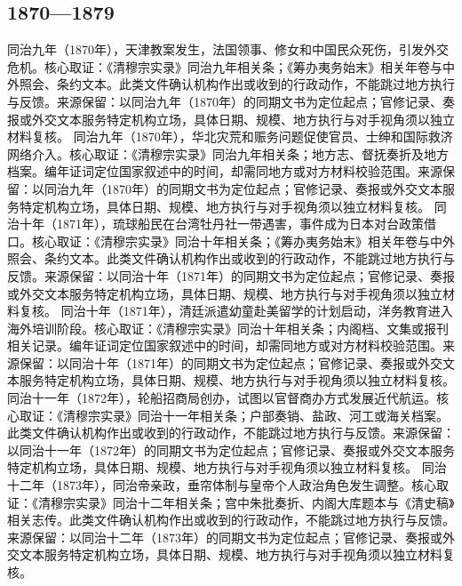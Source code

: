 \subsection{1870—1879}
同治九年（1870年），天津教案发生，法国领事、修女和中国民众死伤，引发外交危机。核心取证：《清穆宗实录》同治九年相关条；《筹办夷务始末》相关年卷与中外照会、条约文本。此类文件确认机构作出或收到的行政动作，不能跳过地方执行与反馈。来源保留：以同治九年（1870年）的同期文书为定位起点；官修记录、奏报或外交文本服务特定机构立场，具体日期、规模、地方执行与对手视角须以独立材料复核。
同治九年（1870年），华北灾荒和赈务问题促使官员、士绅和国际救济网络介入。核心取证：《清穆宗实录》同治九年相关条；地方志、督抚奏折及地方档案。编年证词定位国家叙述中的时间，却需同地方或对方材料校验范围。来源保留：以同治九年（1870年）的同期文书为定位起点；官修记录、奏报或外交文本服务特定机构立场，具体日期、规模、地方执行与对手视角须以独立材料复核。
同治十年（1871年），琉球船民在台湾牡丹社一带遇害，事件成为日本对台政策借口。核心取证：《清穆宗实录》同治十年相关条；《筹办夷务始末》相关年卷与中外照会、条约文本。此类文件确认机构作出或收到的行政动作，不能跳过地方执行与反馈。来源保留：以同治十年（1871年）的同期文书为定位起点；官修记录、奏报或外交文本服务特定机构立场，具体日期、规模、地方执行与对手视角须以独立材料复核。
同治十年（1871年），清廷派遣幼童赴美留学的计划启动，洋务教育进入海外培训阶段。核心取证：《清穆宗实录》同治十年相关条；内阁档、文集或报刊相关记录。编年证词定位国家叙述中的时间，却需同地方或对方材料校验范围。来源保留：以同治十年（1871年）的同期文书为定位起点；官修记录、奏报或外交文本服务特定机构立场，具体日期、规模、地方执行与对手视角须以独立材料复核。
同治十一年（1872年），轮船招商局创办，试图以官督商办方式发展近代航运。核心取证：《清穆宗实录》同治十一年相关条；户部奏销、盐政、河工或海关档案。此类文件确认机构作出或收到的行政动作，不能跳过地方执行与反馈。来源保留：以同治十一年（1872年）的同期文书为定位起点；官修记录、奏报或外交文本服务特定机构立场，具体日期、规模、地方执行与对手视角须以独立材料复核。
同治十二年（1873年），同治帝亲政，垂帘体制与皇帝个人政治角色发生调整。核心取证：《清穆宗实录》同治十二年相关条；宫中朱批奏折、内阁大库题本与《清史稿》相关志传。此类文件确认机构作出或收到的行政动作，不能跳过地方执行与反馈。来源保留：以同治十二年（1873年）的同期文书为定位起点；官修记录、奏报或外交文本服务特定机构立场，具体日期、规模、地方执行与对手视角须以独立材料复核。
